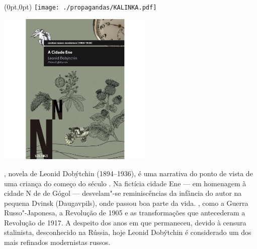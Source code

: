 \pagestyle{kalinka}
\label{kalinka}

\begin{textblock*}{5.625in}(0pt,0pt)%
\vspace*{-3.49cm}
\hspace*{-2.76cm}\texttt{[image: ./propagandas/KALINKA.pdf]}
\end{textblock*}

\pagebreak %

\begin{center}
\hspace*{-3.6cm}
\hspace*{3.1cm}\includegraphics[width=74mm]{./grid/cidaden.jpg}
\end{center}

\hspace*{-7cm}\hrulefill\hspace*{-7cm}

\medskip

, novela de Leonid Dobýtchin (1894--1936), é uma narrativa do ponto de vista de uma criança do começo do século . Na fictícia cidade Ene --- em homenagem à cidade N de {} de Gógol --- desvelam"-se reminiscências da infância do autor na pequena Dvinsk (Daugavpils), onde passou boa parte da vida. , como a Guerra Russo"-Japonesa, a Revolução de 1905 e as transformações que antecederam a Revolução de 1917. A despeito dos anos em que permaneceu, devido à censura stalinista, desconhecido na Rússia, hoje Leonid Dobýtchin é considerado um dos mais refinados modernistas russos. 

